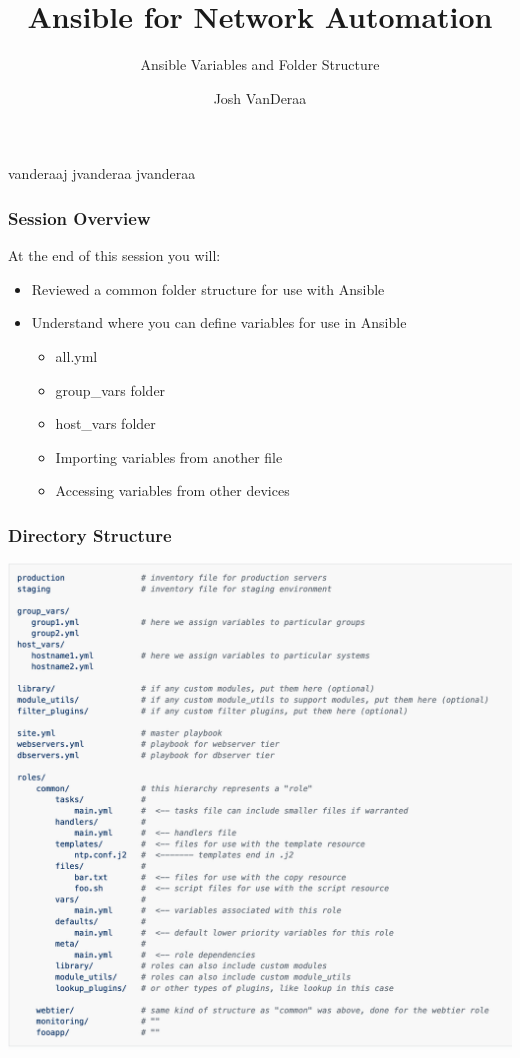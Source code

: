 \documentclass[aspectratio=169]{beamer}
\title{Ansible for Network Automation}
\subtitle{Ansible Variables and Folder Structure}
\date{}
\author{Josh VanDeraa}
\begin{document}
\begin{frame}
  \maketitle
  \footnotesize
  \faTwitter vanderaaj \hfill \faGithub jvanderaa \hfill \faSlack jvanderaa
\end{frame}

\begin{frame}
  \frametitle{Session Overview}
  At the end of this session you will:
  \begin{itemize}
    \item <2-> Reviewed a common folder structure for use with Ansible
    \item <3-> Understand where you can define variables for use in Ansible
    \begin{itemize}
      \item <3-> all.yml
      \item <4-> group\_vars folder
      \item <5-> host\_vars folder
      \item <6-> Importing variables from another file
      \item <7-> Accessing variables from other devices
    \end{itemize}
  \end{itemize}
\end{frame}

\begin{frame}
  \frametitle{Directory Structure}
  \begin{center}
    \includegraphics[height=\textheight]{assets/directory_layout.png}    
  \end{center}  
\end{frame}
  
\end{document}
